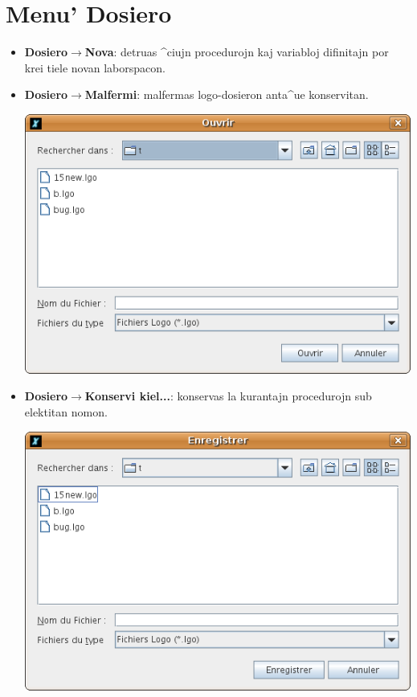\section{Menu' \og Dosiero\fg}
\begin{itemize}
\item \textbf{Dosiero$\to$Nova}: detruas ^ciujn procedurojn kaj
  variabloj difinitajn por krei tiele novan laborspacon.
\item \textbf{Dosiero$\to$Malfermi}: malfermas logo-dosieron anta^ue
  konservitan.
\begin{center}
 \includegraphics[scale=0.4]{bildoj/CaptureOuvrir.png}
\end{center}
\vspace{0.25cm}
\item \textbf{Dosiero$\to$Konservi kiel...}: konservas la kurantajn
  procedurojn sub elektitan nomon.
\begin{center}
 \includegraphics[scale=0.4]{bildoj/CaptureEnregistrer.png}

\end{center}
\end{itemize}
